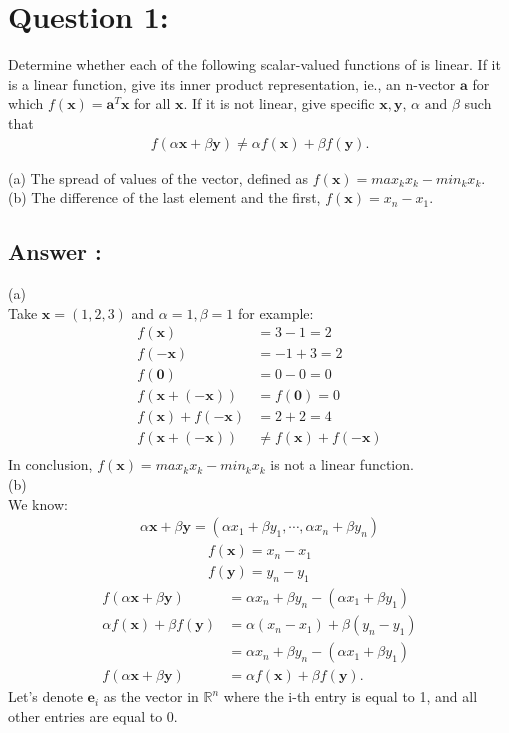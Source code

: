 \documentclass[a4paper,12pt]{article}
\newcommand{\R}{\mathbb{R}}
\begin{document}
\section*{Question 1:}
Determine whether each of the following scalar-valued functions of  is linear. If it is a linear function, give its inner product representation, ie.,
an n-vector \(\bm{a}\) for which \(f(\bm{x}) = \bm{a}^T\bm{x}\) for all \(\bm{x}\). If it is not linear, give specific \(\bm{x}, \bm{y}\), \(\alpha \text{ and } \beta\) such that
\begin{align*}
    f(\alpha \bm{x} + \beta \bm{y}) \neq \alpha f(\bm{x}) + \beta f(\bm{y}).
\end{align*}

(a) The spread of values of the vector, defined as \(f(\bm{x}) = max_kx_k - min_kx_k \). \\
(b) The difference of the last element and the first, \(f(\bm{x}) = x_n - x_1\). \\

\subsection*{Answer :}
(a)  \\
Take \(\bm{x} = (1, 2, 3)\) and \(\alpha = 1, \beta = 1\) for example:
\begin{align*}
    f(\bm{x}) &= 3 - 1 = 2 \\
    f(\bm{-x}) &= -1 + 3 = 2 \\
    f(\bm{0}) &= 0 - 0 = 0 \\
    f(\bm{x} + (-\bm{x})) &= f(\bm{0}) = 0 \\
    f(\bm{x}) + f(-\bm{x}) &= 2 + 2 = 4 \\
    f(\bm{x} + (-\bm{x})) &\neq f(\bm{x}) + f(-\bm{x}) \\
\end{align*}
In conclusion, \(f(\bm{x}) = max_kx_k - min_kx_k \) is not a linear function. \\

(b) \\
We know:
\begin{align*}
    \alpha \bm{x} + \beta \bm{y} = (\alpha x_1 + \beta y_1 , \cdots , \alpha x_n + \beta y_n)
\end{align*}
\begin{align*}
    f(\bm{x}) = x_n - x_1 \\
    f(\bm{y}) = y_n - y_1 
\end{align*}
\begin{align*}
    f(\alpha \bm{x} + \beta \bm{y}) &= \alpha x_n + \beta y_n - (\alpha x_1 + \beta y_1)  \\
    \alpha f(\bm{x}) + \beta f(\bm{y}) &= \alpha(x_n - x_1) + \beta(y_n - y_1)  \\
    &= \alpha x_n + \beta y_n - (\alpha x_1 + \beta y_1) \\
    f(\alpha \bm{x} + \beta \bm{y}) &= \alpha f(\bm{x}) + \beta f(\bm{y}).
\end{align*}
Let's denote \(\bm{e}_i\) as the vector in \(\R^n\) where the i-th entry is equal to 1, and all other entries are equal to 0.
\end{document}
